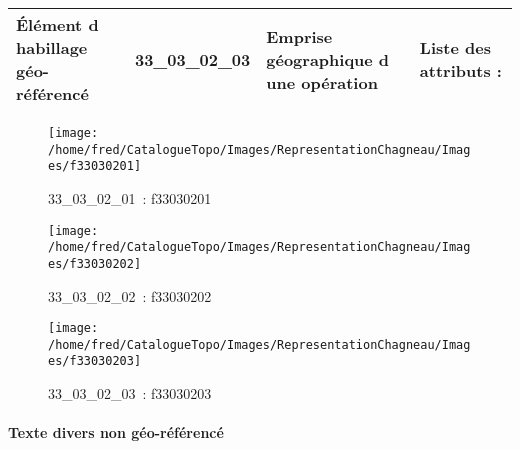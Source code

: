 \documentclass[12pt,titlepage]{book}
\begin{document}
\renewcommand{\arraystretch}{1.2}
\begin{supertabular}{|p{10cm}|c|p{13cm}|p{12cm}|}
 Élément d habillage géo-référencé & 33\_03\_02\_03 & Emprise géographique d une opération & Liste des attributs :
\begin{enumerate}
\end{enumerate}
\\
\hline
\end{supertabular}
\begin{figure}[h!]
  \hfill         %
  \begin{minipage}[t]{3cm}
    \begin{center}
      \texttt{[image: /home/fred/CatalogueTopo/Images/RepresentationChagneau/Images/f33030201]}
      \caption[~33\_03\_02\_01]{\small{33\_03\_02\_01~:} \tiny{f33030201}}\label{f33030201}
    \end{center}
  \end{minipage}
  \begin{minipage}[t]{3cm}
    \begin{center}
      \texttt{[image: /home/fred/CatalogueTopo/Images/RepresentationChagneau/Images/f33030202]}
      \caption[~33\_03\_02\_02]{\small{33\_03\_02\_02~:} \tiny{f33030202}}\label{f33030202}
    \end{center}
  \end{minipage}
  \begin{minipage}[t]{3cm}
    \begin{center}
      \texttt{[image: /home/fred/CatalogueTopo/Images/RepresentationChagneau/Images/f33030203]}
      \caption[~33\_03\_02\_03]{\small{33\_03\_02\_03~:} \tiny{f33030203}}\label{f33030203}
    \end{center}
  \end{minipage}
\end{figure}


\paragraph{Texte divers non géo-référencé}
\noindent
\vspace{\baselineskip}
\end{document}
